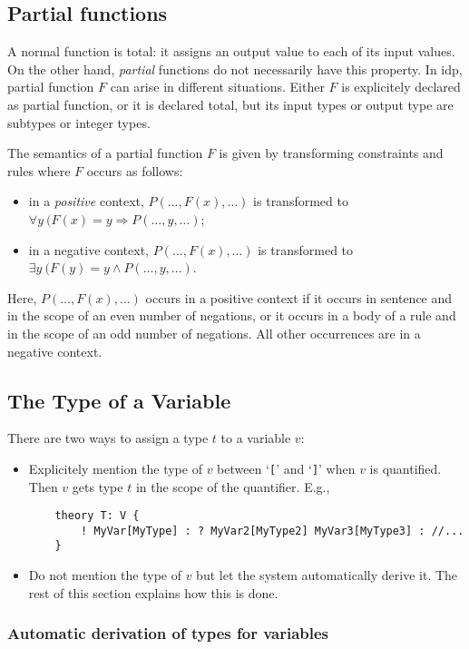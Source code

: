 \documentclass[a4]{article}
\newcommand{\idp}{{\sc idp}\xspace}
\newcommand{\lir}{\Rightarrow}
\begin{document}
\subsection{Partial functions}\label{ssec:partial}
A normal function is total: it assigns an output value to each of its input values. On the other hand, \emph{partial} functions do not necessarily have this property. In \idp, partial function $F$ can arise in different situations. Either $F$ is explicitely declared as partial function, or it is declared total, but its input types or output type are subtypes or integer types.

The semantics of a partial function $F$ is given by transforming constraints and rules where $F$ occurs as follows:
\begin{itemize}
	\item in a \emph{positive} context, $P(\ldots,F(x),\ldots)$ is transformed to $\forall y\ (F(x) = y \lir P(\ldots,y,\ldots)$;
	\item in a negative context, $P(\ldots,F(x),\ldots)$ is transformed to $\exists y\ (F(y) = y \land P(\ldots,y,\ldots)$.
\end{itemize}
Here, $P(\ldots,F(x),\ldots)$ occurs in a positive context if it occurs in sentence and in the scope of an even number of negations, or it occurs in a body of a rule and in the scope of an odd number of negations. All other occurrences are in a negative context. 

                                                              
\subsection{The Type of a Variable}\label{ssec:vtype}
There are two ways to assign a type $t$ to a variable $v$:
\begin{itemize}
	\item Explicitely mention the type of $v$ between `{\tt [}' and `{\tt ]}' when $v$ is quantified. Then $v$ gets type $t$ in the scope of the quantifier. E.g.,
	\begin{lstlisting}
	theory T: V {
		! MyVar[MyType] : ? MyVar2[MyType2] MyVar3[MyType3] : //...
	}
	\end{lstlisting}
	\item Do not mention the type of $v$ but let the system automatically derive it. The rest of this section explains how this is done.
\end{itemize}

\subsubsection{Automatic derivation of types for variables}
\end{document}
